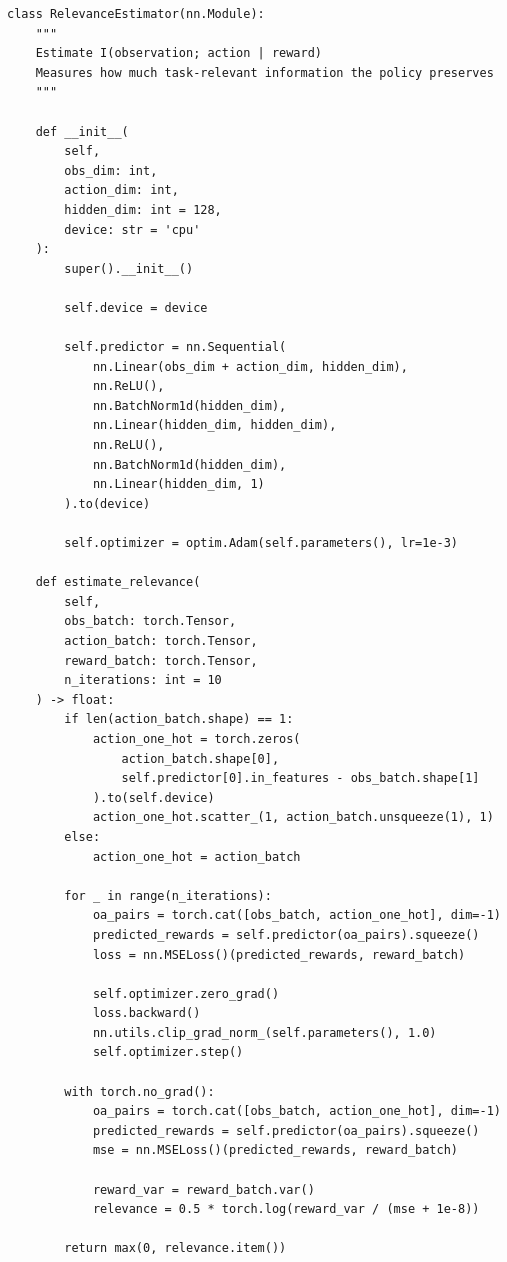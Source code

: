 \documentclass[10pt, letterpaper]{article}
\begin{document}
\begin{lstlisting}
class RelevanceEstimator(nn.Module):
    """
    Estimate I(observation; action | reward)
    Measures how much task-relevant information the policy preserves
    """

    def __init__(
        self,
        obs_dim: int,
        action_dim: int,
        hidden_dim: int = 128,
        device: str = 'cpu'
    ):
        super().__init__()

        self.device = device

        self.predictor = nn.Sequential(
            nn.Linear(obs_dim + action_dim, hidden_dim),
            nn.ReLU(),
            nn.BatchNorm1d(hidden_dim),
            nn.Linear(hidden_dim, hidden_dim),
            nn.ReLU(),
            nn.BatchNorm1d(hidden_dim),
            nn.Linear(hidden_dim, 1)
        ).to(device)

        self.optimizer = optim.Adam(self.parameters(), lr=1e-3)

    def estimate_relevance(
        self,
        obs_batch: torch.Tensor,
        action_batch: torch.Tensor,
        reward_batch: torch.Tensor,
        n_iterations: int = 10
    ) -> float:
        if len(action_batch.shape) == 1:
            action_one_hot = torch.zeros(
                action_batch.shape[0],
                self.predictor[0].in_features - obs_batch.shape[1]
            ).to(self.device)
            action_one_hot.scatter_(1, action_batch.unsqueeze(1), 1)
        else:
            action_one_hot = action_batch

        for _ in range(n_iterations):
            oa_pairs = torch.cat([obs_batch, action_one_hot], dim=-1)
            predicted_rewards = self.predictor(oa_pairs).squeeze()
            loss = nn.MSELoss()(predicted_rewards, reward_batch)

            self.optimizer.zero_grad()
            loss.backward()
            nn.utils.clip_grad_norm_(self.parameters(), 1.0)
            self.optimizer.step()

        with torch.no_grad():
            oa_pairs = torch.cat([obs_batch, action_one_hot], dim=-1)
            predicted_rewards = self.predictor(oa_pairs).squeeze()
            mse = nn.MSELoss()(predicted_rewards, reward_batch)

            reward_var = reward_batch.var()
            relevance = 0.5 * torch.log(reward_var / (mse + 1e-8))

        return max(0, relevance.item())
\end{lstlisting}
\end{document}
